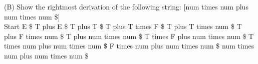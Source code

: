 \documentclass[letterpaper, 10pt]{article}
\begin{document}
\noindent
(B) Show the rightmost derivation of the following string: [num times num plus num times num \$]\\
Start \newline
E \$\newline
T plus E \$\newline
T plus T \$\newline
T plus T times F \$\newline
T plus T times num \$\newline
T plus F times num \$\newline
T plus num times num \$\newline
T times F plus num times num \$\newline
T times num plus num times num \$\newline
F times num plus num times num \$\newline
num times num plus num times num \$\newline
\end{document}
